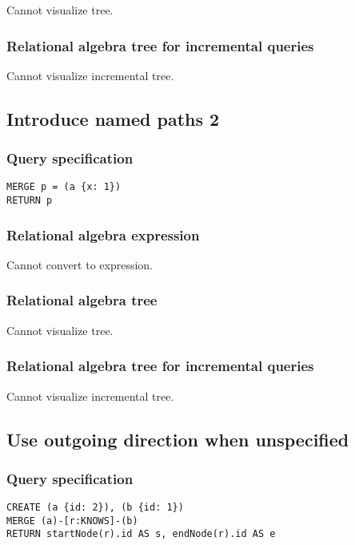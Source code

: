 Cannot visualize tree.

\subsubsection*{Relational algebra tree for incremental queries}

Cannot visualize incremental tree.

\subsection{Introduce named paths 2}

\subsubsection*{Query specification}

\begin{lstlisting}
MERGE p = (a {x: 1})
RETURN p
\end{lstlisting}

\subsubsection*{Relational algebra expression}

Cannot convert to expression.

\subsubsection*{Relational algebra tree}

Cannot visualize tree.

\subsubsection*{Relational algebra tree for incremental queries}

Cannot visualize incremental tree.

\subsection{Use outgoing direction when unspecified}

\subsubsection*{Query specification}

\begin{lstlisting}
CREATE (a {id: 2}), (b {id: 1})
MERGE (a)-[r:KNOWS]-(b)
RETURN startNode(r).id AS s, endNode(r).id AS e
\end{lstlisting}

